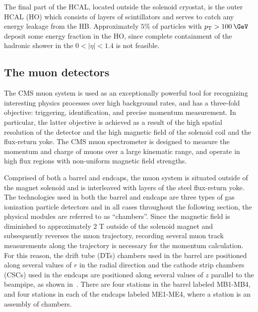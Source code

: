 The final part of the HCAL, located outside the solenoid cryostat, is the outer HCAL (HO) which consists of layers of scintillators and serves to catch any energy leakage from the HB. Approximately $5\%$ of particles with $\pt > 100\:\GeV$ deposit some energy fraction in the HO, since complete containment of the hadronic shower in the $0 < |\eta| < 1.4$ is not feasible.

\subsection{The muon detectors}
\label{subsec:muons}

The CMS muon system is used as an exceptionally powerful tool for recognizing interesting physics processes over high background rates, and has a three-fold objective: triggering, identification, and precise momentum measurement. In particular, the latter objective is achieved as a result of the high spatial resolution of the detector and the high magnetic field of the solenoid coil and the flux-return yoke. The CMS muon spectrometer is designed to measure the momentum and charge of muons over a large kinematic range, and operate in high flux regions with non-uniform magnetic field strengths.

Comprised of both a barrel and endcaps, the muon system is situated outside of the magnet solenoid and is interleaved with layers of the steel flux-return yoke. The technologies used in both the barrel and endcaps are three types of gas ionization particle detectors and in all cases throughout the following section, the physical modules are referred to as ``chambers''. Since the magnetic field is diminished to approximately 2 T outside of the solenoid magnet and subsequently reverses the muon trajectory, recording several muon track measurements along the trajectory is necessary for the momentum calculation. For this reason, the drift tube (DTs) chambers used in the barrel are positioned along several values of $r$ in the radial direction and the cathode strip chambers (CSCs) used in the endcaps are positioned along several values of $z$ parallel to the beampipe, as shown in~. There are four stations in the barrel labeled MB1-MB4, and four stations in each of the endcaps labeled ME1-ME4, where a station is an assembly of chambers.

